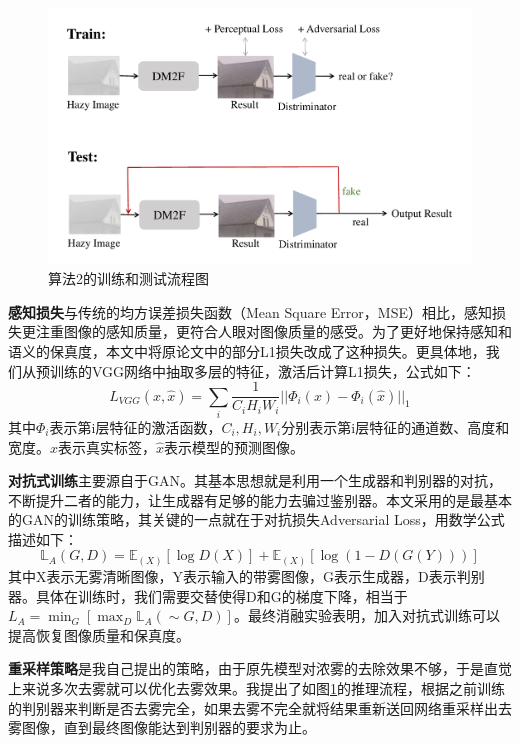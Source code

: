 \documentclass{article}
\begin{document}
\begin{figure}[t]
  \centering
  \includegraphics[width=.9\linewidth]{image/pip2.pdf}
  \caption{算法2的训练和测试流程图}
  \label{fig:fig5}
\end{figure}

\textbf{感知损失}与传统的均方误差损失函数（Mean Square Error，MSE）相比，感知损失更注重图像的感知质量，更符合人眼对图像质量的感受。为了更好地保持感知和语义的保真度，本文中将原论文中的部分L1损失改成了这种损失。更具体地，我们从预训练的VGG网络中抽取多层的特征，激活后计算L1损失，公式如下：
\begin{equation}
  L_{VGG}(x, \hat{x}) = \sum_{i}{\frac{1}{C_iH_iW_i}}||\Phi_i(x) - \Phi_i(\hat{x})||_1
  \label{eq:perceptualloss}
\end{equation}
其中$\Phi_i$表示第i层特征的激活函数，$C_i, H_i, W_i$分别表示第i层特征的通道数、高度和宽度。$x$表示真实标签，$\hat{x}$表示模型的预测图像。

\textbf{对抗式训练}主要源自于GAN\cite{creswell2018generative}。其基本思想就是利用一个生成器和判别器的对抗，不断提升二者的能力，让生成器有足够的能力去骗过鉴别器。本文采用的是最基本的GAN的训练策略，其关键的一点就在于对抗损失Adversarial Loss，用数学公式描述如下：
\begin{equation}
  \mathbb{L}_A(G, D) = \mathbb{E}_{(X)} [\log D(X)] + \mathbb{E}_{(X)} [\log (1 - D(G(Y)))]
  \label{eq:adversarialloss}
\end{equation}
其中X表示无雾清晰图像，Y表示输入的带雾图像，G表示生成器，D表示判别器。具体在训练时，我们需要交替使得D和G的梯度下降，相当于$L_A = \min_{G} \left[ \max_{D} \mathbb{L}_A(\sim G, D) \right]$。最终消融实验表明，加入对抗式训练可以提高恢复图像质量和保真度。

\textbf{重采样策略}是我自己提出的策略，由于原先模型对浓雾的去除效果不够，于是直觉上来说多次去雾就可以优化去雾效果。我提出了如图\ref{fig:fig5}的推理流程，根据之前训练的判别器来判断是否去雾完全，如果去雾不完全就将结果重新送回网络重采样出去雾图像，直到最终图像能达到判别器的要求为止。
\end{document}
